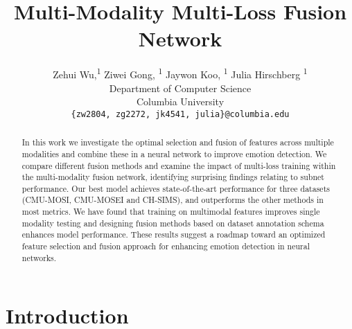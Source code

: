 \documentclass[11pt]{article}
\title{Multi-Modality Multi-Loss Fusion Network}
\author {
Zehui Wu\footnotemark[1],\textsuperscript{\rm 1}
    Ziwei Gong\footnotemark[1], \textsuperscript{\rm 1}
    Jaywon Koo, \textsuperscript{\rm 1}
    Julia Hirschberg \textsuperscript{\rm 1}\\
  Department of Computer Science\\Columbia University\\
  \texttt{\{zw2804, zg2272, jk4541, julia\}@columbia.edu} 
}
\begin{document}
\maketitle
\renewcommand{\thefootnote}{\fnsymbol{footnote}} 
\begin{abstract}
In this work we investigate the optimal selection and fusion of features across multiple modalities and combine these in a neural network to improve emotion detection. We compare different fusion methods and examine the impact of multi-loss training within the multi-modality fusion network, identifying surprising findings relating to subnet performance. Our best model achieves state-of-the-art performance for three datasets (CMU-MOSI, CMU-MOSEI and CH-SIMS), and outperforms the other methods in most metrics. We have found that training on multimodal features improves single modality testing and designing fusion methods based on dataset annotation schema enhances model performance. These results suggest a roadmap toward an optimized feature selection and fusion approach for enhancing emotion detection in neural networks.



\end{abstract}

\section{Introduction}
\end{document}

